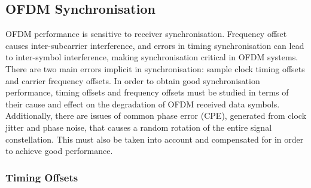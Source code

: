 \subsection{OFDM Synchronisation}

OFDM performance is sensitive to receiver synchronisation.
Frequency offset causes inter-subcarrier interference, and errors in timing synchronisation can lead to inter-symbol interference, making synchronisation critical in OFDM systems.
There are two main errors implicit in synchronisation: sample clock timing offsets and carrier frequency offsets.
In order to obtain good synchronisation performance, timing offsets and frequency offsets must be studied in terms of their cause and effect on the degradation of OFDM received data symbols.
Additionally, there are issues of common phase error (CPE), generated from clock jitter and phase noise, that causes a random rotation of the entire signal constellation.
This must also be taken into account and compensated for in order to achieve good performance.

\subsubsection{Timing Offsets}

